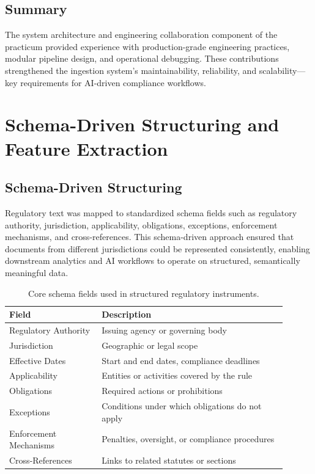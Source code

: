 \documentclass[sigconf]{acmart}
\begin{document}
\subsection{Summary}

The system architecture and engineering collaboration component of the practicum provided experience with production-grade engineering practices, modular pipeline design, and operational debugging. These contributions strengthened the ingestion system’s maintainability, reliability, and scalability—key requirements for AI-driven compliance workflows.

\section{Schema-Driven Structuring and Feature Extraction}

\subsection{Schema-Driven Structuring}
Regulatory text was mapped to standardized schema fields such as regulatory authority, jurisdiction, applicability, obligations, exceptions, enforcement mechanisms, and cross-references. This schema-driven approach ensured that documents from different jurisdictions could be represented consistently, enabling downstream analytics and AI workflows to operate on structured, semantically meaningful data.

\begin{table}[h]
\centering
\begin{tabular}{p{0.3\linewidth} p{0.6\linewidth}}
\toprule
\textbf{Field} & \textbf{Description} \\
\midrule
Regulatory Authority & Issuing agency or governing body \\
Jurisdiction & Geographic or legal scope \\
Effective Dates & Start and end dates, compliance deadlines \\
Applicability & Entities or activities covered by the rule \\
Obligations & Required actions or prohibitions \\
Exceptions & Conditions under which obligations do not apply \\
Enforcement Mechanisms & Penalties, oversight, or compliance procedures \\
Cross-References & Links to related statutes or sections \\
\bottomrule
\end{tabular}
\caption{Core schema fields used in structured regulatory instruments.}
\end{table}
\end{document}
